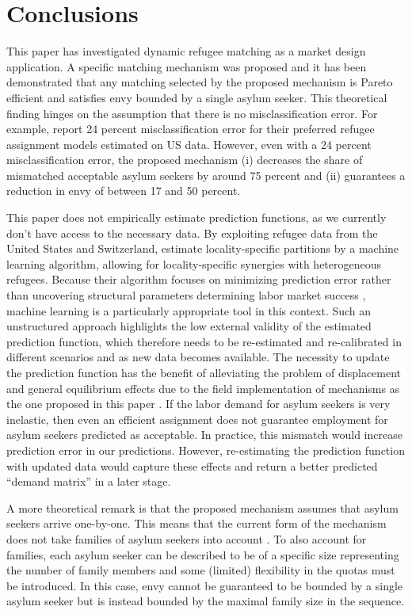 \documentclass[12pt,fleqn]{article}
\begin{document}
\section{Conclusions}\label{SEC:conclusions}
This paper has investigated dynamic refugee matching as a market design application. A specific matching mechanism was proposed and it has been demonstrated that any matching selected by the proposed mechanism is Pareto efficient and satisfies envy bounded by a single asylum seeker. This theoretical finding hinges on the assumption that there is no misclassification error. For example, \cite{bib:BansakEtAl} report 24 percent misclassification error for their preferred refugee assignment models estimated on US data. However, even with a 24 percent misclassification error, the proposed mechanism (i) decreases the share of mismatched acceptable asylum seekers by around 75 percent and (ii) guarantees a reduction in envy of between 17 and 50 percent.

This paper does not empirically estimate prediction functions, as we currently don't have access to the necessary data. By exploiting refugee data from the United States and Switzerland, \cite{bib:BansakEtAl} estimate locality-specific partitions by a machine learning algorithm, allowing for locality-specific synergies with heterogeneous refugees. Because their algorithm focuses on minimizing prediction error rather than uncovering structural parameters determining labor market success \citep{bib:MullainathanSpiess}, machine learning is a particularly appropriate tool in this context. Such an unstructured approach highlights the low external validity of the estimated prediction function, which therefore needs to be re-estimated and re-calibrated in different scenarios and as new data becomes available. The necessity to update the prediction function has the benefit of alleviating the problem of displacement and general equilibrium effects due to the field implementation of mechanisms as the one proposed in this paper \citep{bib:CreponEtAl}. If the labor demand for asylum seekers is very inelastic, then even an efficient assignment does not guarantee employment for asylum seekers predicted as acceptable. In practice, this mismatch would increase prediction error in our predictions. However, re-estimating the prediction function with updated data would capture these effects and return a better predicted ``demand matrix'' in a later stage.

A more theoretical remark is that the proposed mechanism assumes that asylum seekers arrive one-by-one. This means that the current form of the mechanism does not take families of asylum seekers into account \citep[see, e.g.,][for a mechanism that keeps families intact in house allocation problems with asylum seekers]{bib:AnderssonEhlers}. To also account for families, each asylum seeker can be described to be of a specific size representing the number of family members and some (limited) flexibility in the quotas must be introduced. In this case, envy cannot be guaranteed to be bounded by a single asylum seeker but is instead bounded by the maximal family size in the sequence.
\end{document}

